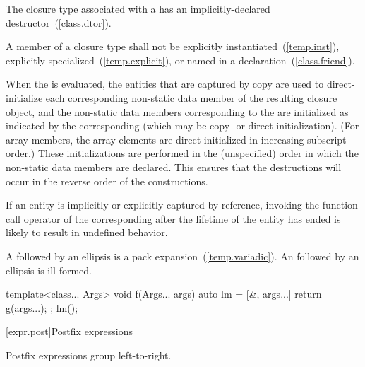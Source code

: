 \pnum
The closure type associated with a  has an
implicitly-declared destructor~(\ref{class.dtor}).

\pnum
A member of a closure type shall not be
explicitly instantiated~(\ref{temp.inst}),
explicitly specialized~(\ref{temp.explicit}), or
named in a  declaration~(\ref{class.friend}).

\pnum
When the  is evaluated, the entities that are
captured by copy are used to direct-initialize each corresponding non-static data member
of the resulting closure object, and the non-static data members corresponding to the
 are initialized as indicated by the corresponding
 (which may be copy- or direct-initialization). (For array members, the array elements are
direct-initialized in increasing subscript order.) These initializations are performed
in the (unspecified) order in which the non-static data members are declared. \enternote
This ensures that the destructions will occur in the reverse order of the constructions.
\exitnote

\pnum
\enternote If an entity is implicitly or explicitly captured by reference,
invoking the function call operator of the corresponding 
after the lifetime of the entity has ended is likely to result in undefined behavior.
\exitnote

\pnum
A  followed by an ellipsis is a pack
expansion~(\ref{temp.variadic}). An  followed by an
ellipsis is ill-formed.
\enterexample
\begin{codeblock}
template<class... Args>
void f(Args... args) {
  auto lm = [&, args...] { return g(args...); };
  lm();
}
\end{codeblock}
\exitexample%
%

[expr.post]{Postfix expressions}%

\pnum
Postfix expressions group left-to-right.

